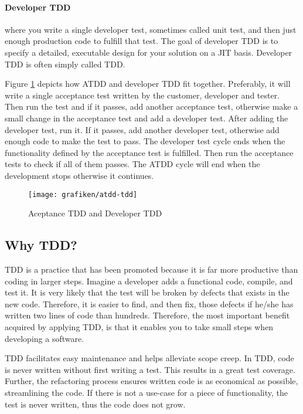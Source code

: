\paragraph{Developer TDD} where you write a single developer test, sometimes called unit test, and then just enough production code to fulfill that test. The goal of developer TDD is to specify a detailed, executable design for your solution on a JIT basis. Developer TDD is often simply called TDD\cite{Ambler2013}.

Figure \ref{fig:atdd-tdd} depicts how ATDD and developer TDD fit together. Preferably, it will write a single acceptance test written by the customer, developer and tester. Then run the test and if it passes, add another acceptance test, otherwise make a small change in the acceptance test and add a developer test. After adding the developer test, run it. If it passes, add another developer test, otherwise add enough code to make the test to pass. The developer test cycle ends when the functionality defined by the acceptance test is fulfilled. Then run the acceptance tests to check if all of them passes. The ATDD cycle will end when the development stops otherwise it continues.

\begin{figure}[H]
	\centering
    \texttt{[image: grafiken/atdd-tdd]}
    \caption{Aceptance TDD and Developer TDD\cite{Ambler2013}}
    \label{fig:atdd-tdd}
\end{figure}  

\subsection{Why TDD?}
TDD is a practice that has been promoted because it is far more productive than coding in larger steps\citep{Ambler2013}. Imagine a developer adds a functional code, compile, and test it. It is very likely that the test will be broken by defects that exists in the new code. Therefore, it is easier to find, and then fix, those defects if he/she has written two lines of code than hundreds. Therefore, the most important benefit acquired by applying TDD, is that it enables you to take small steps when developing a software.

TDD facilitates easy maintenance and helps alleviate scope creep. In TDD, code is never written without first writing a test. This results in a great test coverage. Further, the refactoring process ensures written code is as economical as possible, streamlining the code. If there is not a use-case for a piece of functionality, the test is never written, thus the code does not grow.

